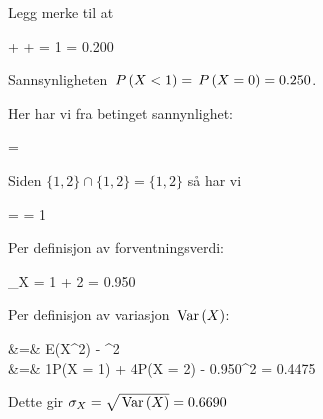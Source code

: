 \statistikk
\oppgave
Legg merke til at
\begin{utregning}
	 +  +  = 1 \quad \implies \quad {} = 0.200
\end{utregning}
\deloppgave
Sannsynligheten $\,P\left(X < 1\right) = \,P\left(X = 0\right) = 0.250$.

\deloppgave
Her har vi fra betinget sannynlighet:
\begin{likning}
	 = 
\end{likning}
Siden $\{1, 2\} \cap \{1, 2\} = \{1, 2\}$ så har vi
\begin{likning}
	 =  = 1
\end{likning}

\deloppgave
Per definisjon av forventningsverdi:
\begin{likning}
	\mu_X = 1\cdot {} + 2 = 0.950
\end{likning}

\deloppgave
Per definisjon av variasjon $\, \mathrm{Var}\left(X\right)$:
\begin{utregning}
	 &=& E\left(X^2\right) - ^2\\
	&=& 1\cdot P(X = 1) + 4\cdot P(X = 2) - 0.950^2 = 0.4475
\end{utregning}
Dette gir $\sigma_X = \sqrt{\, \mathrm{Var}\left(X\right)} = 0.6690$

